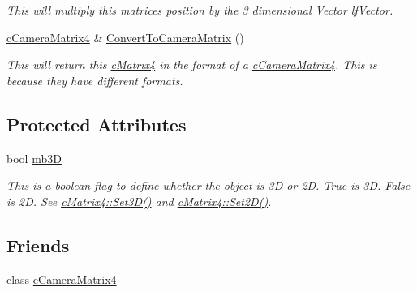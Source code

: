 \begin{DoxyCompactItemize}
\begin{DoxyCompactList}\small\item\em This will multiply this matrices position by the 3 dimensional Vector lfVector. \end{DoxyCompactList}\item 
\hypertarget{classc_matrix4_ac6bb495542c08395c26fd412db13a959}{
\hyperlink{classc_camera_matrix4}{cCameraMatrix4} \& \hyperlink{classc_matrix4_ac6bb495542c08395c26fd412db13a959}{ConvertToCameraMatrix} ()}
\label{classc_matrix4_ac6bb495542c08395c26fd412db13a959}

\begin{DoxyCompactList}\small\item\em This will return this \hyperlink{classc_matrix4}{cMatrix4} in the format of a \hyperlink{classc_camera_matrix4}{cCameraMatrix4}. This is because they have different formats. \end{DoxyCompactList}\end{DoxyCompactItemize}
\subsection*{Protected Attributes}
\begin{DoxyCompactItemize}
\item 
\hypertarget{classc_matrix4_ac0ebba0d10d97c6657dccd1575f761ab}{
bool \hyperlink{classc_matrix4_ac0ebba0d10d97c6657dccd1575f761ab}{mb3D}}
\label{classc_matrix4_ac0ebba0d10d97c6657dccd1575f761ab}

\begin{DoxyCompactList}\small\item\em This is a boolean flag to define whether the object is 3D or 2D. True is 3D. False is 2D. See \hyperlink{classc_matrix4_a746ce09337cbf6a3292cbe15991efd79}{cMatrix4::Set3D()} and \hyperlink{classc_matrix4_ad24236403317622459c3309938be9d21}{cMatrix4::Set2D()}. \end{DoxyCompactList}\end{DoxyCompactItemize}
\subsection*{Friends}
\begin{DoxyCompactItemize}
\item 
\hypertarget{classc_matrix4_ad892cad8874ae954d2e9de55b17ded93}{
class \hyperlink{classc_matrix4_ad892cad8874ae954d2e9de55b17ded93}{cCameraMatrix4}}
\label{classc_matrix4_ad892cad8874ae954d2e9de55b17ded93}

\end{DoxyCompactItemize}


